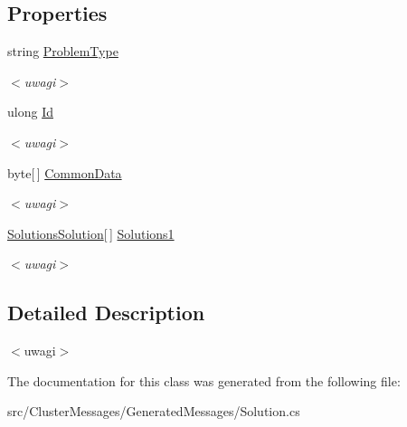 \subsection*{Properties}
\begin{DoxyCompactItemize}
\item 
\hypertarget{class_solutions_adc5a6394fb6842c6f06931a1faefd882}{}string \hyperlink{class_solutions_adc5a6394fb6842c6f06931a1faefd882}{Problem\+Type}\label{class_solutions_adc5a6394fb6842c6f06931a1faefd882}

\begin{DoxyCompactList}\small\item\em $<$uwagi$>$ \end{DoxyCompactList}\item 
\hypertarget{class_solutions_ab165186239e40fad38742b9948a0fb72}{}ulong \hyperlink{class_solutions_ab165186239e40fad38742b9948a0fb72}{Id}\label{class_solutions_ab165186239e40fad38742b9948a0fb72}

\begin{DoxyCompactList}\small\item\em $<$uwagi$>$ \end{DoxyCompactList}\item 
\hypertarget{class_solutions_acd5c1684897098f940fef5173caa58a8}{}byte\mbox{[}$\,$\mbox{]} \hyperlink{class_solutions_acd5c1684897098f940fef5173caa58a8}{Common\+Data}\label{class_solutions_acd5c1684897098f940fef5173caa58a8}

\begin{DoxyCompactList}\small\item\em $<$uwagi$>$ \end{DoxyCompactList}\item 
\hypertarget{class_solutions_ab51f8e003d60efbf94fa8b7873bc5308}{}\hyperlink{class_solutions_solution}{Solutions\+Solution}\mbox{[}$\,$\mbox{]} \hyperlink{class_solutions_ab51f8e003d60efbf94fa8b7873bc5308}{Solutions1}\label{class_solutions_ab51f8e003d60efbf94fa8b7873bc5308}

\begin{DoxyCompactList}\small\item\em $<$uwagi$>$ \end{DoxyCompactList}\end{DoxyCompactItemize}


\subsection{Detailed Description}
$<$uwagi$>$ 

The documentation for this class was generated from the following file\+:\begin{DoxyCompactItemize}
\item 
src/\+Cluster\+Messages/\+Generated\+Messages/Solution.\+cs\end{DoxyCompactItemize}
